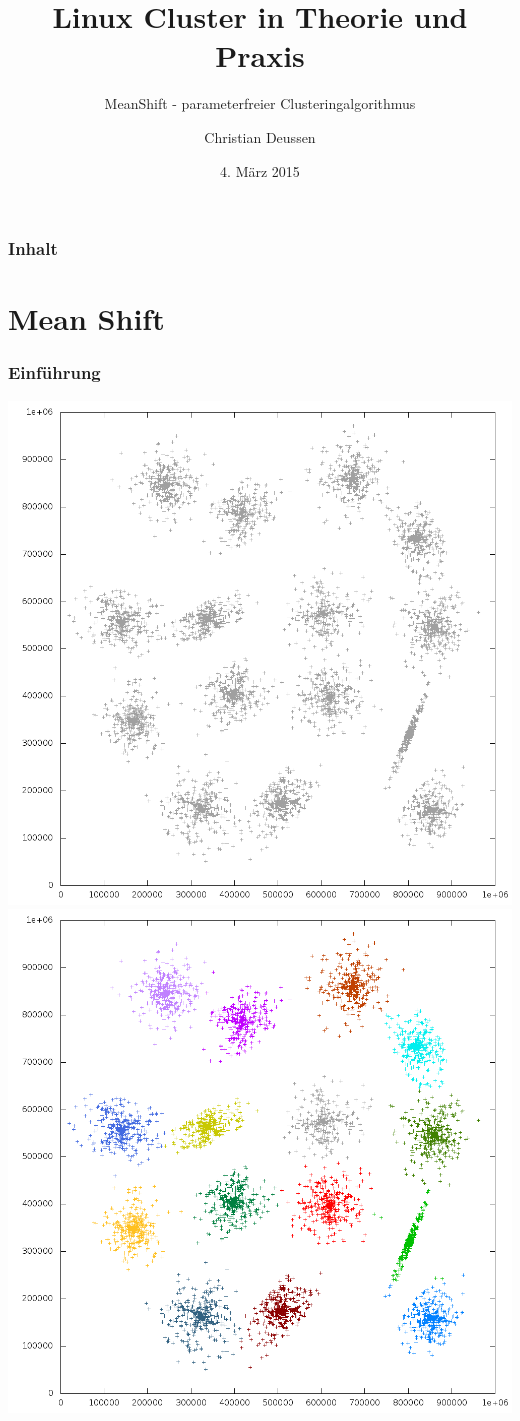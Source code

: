 \documentclass[10pt,utf8]{beamer}
\title{Linux Cluster in Theorie und Praxis}
\subtitle{MeanShift - parameterfreier Clusteringalgorithmus}
\author{Christian Deussen}
\date{4. M\"arz 2015}
\institute[ZIH TUD]{Zentrum f\"ur Informationsdienste und Hochleistungsrechnen -- TU Dresden}
\begin{document}
\zihmaketitle

\begin{frame}
\frametitle{Inhalt}
	\tableofcontents
\end{frame}

\section{Mean Shift}
\begin{frame}
	\frametitle{Einf\"uhrung}
	\includegraphics[scale=0.22, keepaspectratio]{../output/pics/s1_black.png}
	\includegraphics[scale=0.22, keepaspectratio]{../output/pics/s1_colored.png}
\end{frame}
\end{document}
